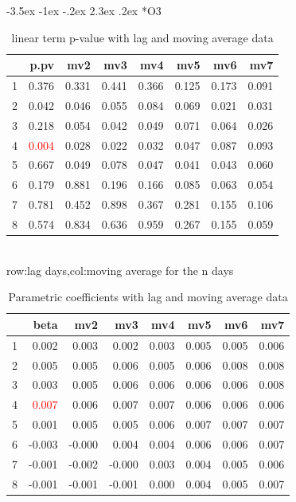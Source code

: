 \documentclass[a4paper, 12pt]{article}
\makeatletter
\def\large{\fontsize{14}{20}\selectfont}
\renewcommand\subsection{\@startsection {subsection}{1}{\z@}%
                                   {-3.5ex \@plus -1ex \@minus -.2ex}%
                                   {2.3ex \@plus.2ex}%
                                   {\centering\normalfont\large\bfseries}}
\makeatother
\begin{document}
\subsection*{O3}
\begin{table}[h]
\centering
\caption{linear term p-value with lag and moving average data}
\begin{tabular}{rrrrrrrr}
  \hline
 & p.pv & mv2 & mv3 & mv4 & mv5 & mv6 & mv7 \\
  \hline
1 & 0.376 & 0.331 & 0.441 & 0.366 & 0.125 & 0.173 & 0.091 \\
  2 & 0.042 & 0.046 & 0.055 & 0.084 & 0.069 & 0.021 & 0.031 \\
  3 & 0.218 & 0.054 & 0.042 & 0.049 & 0.071 & 0.064 & 0.026 \\
  4 & \textcolor{red}{0.004} & 0.028 & 0.022 & 0.032 & 0.047 & 0.087 & 0.093 \\
  5 & 0.667 & 0.049 & 0.078 & 0.047 & 0.041 & 0.043 & 0.060 \\
  6 & 0.179 & 0.881 & 0.196 & 0.166 & 0.085 & 0.063 & 0.054 \\
  7 & 0.781 & 0.452 & 0.898 & 0.367 & 0.281 & 0.155 & 0.106 \\
  8 & 0.574 & 0.834 & 0.636 & 0.959 & 0.267 & 0.155 & 0.059 \\
   \hline
\end{tabular}
\\row:lag days,col:moving average for the n days
\end{table}

\begin{table}[h]
\centering
\caption{Parametric coefficients with lag and moving average data}
\begin{tabular}{rrrrrrrr}
  \hline
 & beta & mv2 & mv3 & mv4 & mv5 & mv6 & mv7 \\
  \hline
1 & 0.002 & 0.003 & 0.002 & 0.003 & 0.005 & 0.005 & 0.006 \\
  2 & 0.005 & 0.005 & 0.006 & 0.005 & 0.006 & 0.008 & 0.008 \\
  3 & 0.003 & 0.005 & 0.006 & 0.006 & 0.006 & 0.006 & 0.008 \\
  4 & \textcolor{red}{0.007} & 0.006 & 0.007 & 0.007 & 0.006 & 0.006 & 0.006 \\
  5 & 0.001 & 0.005 & 0.005 & 0.006 & 0.007 & 0.007 & 0.007 \\
  6 & -0.003 & -0.000 & 0.004 & 0.004 & 0.006 & 0.006 & 0.007 \\
  7 & -0.001 & -0.002 & -0.000 & 0.003 & 0.004 & 0.005 & 0.006 \\
  8 & -0.001 & -0.001 & -0.001 & 0.000 & 0.004 & 0.005 & 0.007 \\
   \hline
\end{tabular}
\end{table}
\clearpage
\end{document}
